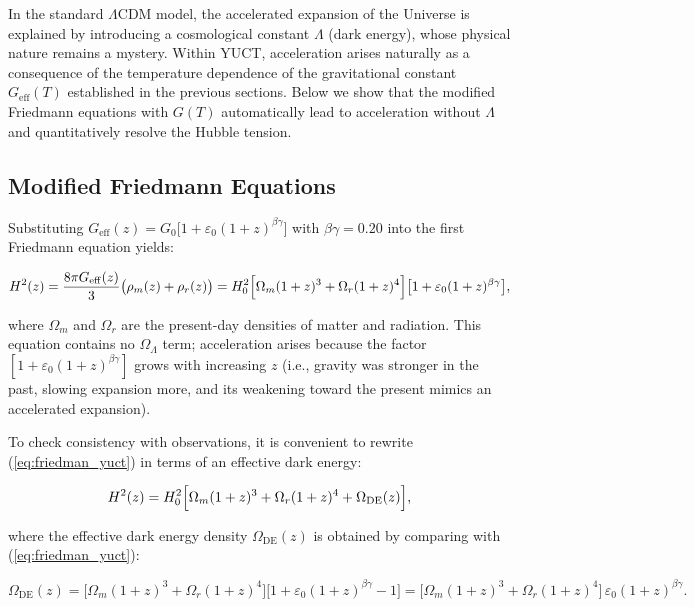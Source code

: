 \documentclass[12pt]{article}
\theoremstyle{remark}
\begin{document}
	In the standard \(\Lambda\)CDM model, the accelerated expansion of the Universe is explained by introducing a cosmological constant \(\Lambda\) (dark energy), whose physical nature remains a mystery. Within YUCT, acceleration arises naturally as a consequence of the temperature dependence of the gravitational constant \(G_{\mathrm{eff}}(T)\) established in the previous sections. Below we show that the modified Friedmann equations with \(G(T)\) automatically lead to acceleration without \(\Lambda\) and quantitatively resolve the Hubble tension.
	
	\subsection{Modified Friedmann Equations}
	
	Substituting \(G_{\mathrm{eff}}(z) = G_0\bigl[1 + \varepsilon_0 (1+z)^{\beta\gamma}\bigr]\) with \(\beta\gamma = 0.20\) into the first Friedmann equation yields:
	
	\begin{equation}
		H^2(z) = \frac{8\pi G_{\mathrm{eff}}(z)}{3} \bigl(\rho_m(z) + \rho_r(z)\bigr) = H_0^2\Bigl[\Omega_m (1+z)^3 + \Omega_r (1+z)^4\Bigr]\bigl[1 + \varepsilon_0 (1+z)^{\beta\gamma}\bigr],
		\label{eq:friedman_yuct}
	\end{equation}
	
	where \(\Omega_m\) and \(\Omega_r\) are the present-day densities of matter and radiation. This equation contains no \(\Omega_\Lambda\) term; acceleration arises because the factor \([1 + \varepsilon_0 (1+z)^{\beta\gamma}]\) grows with increasing \(z\) (i.e., gravity was stronger in the past, slowing expansion more, and its weakening toward the present mimics an accelerated expansion).
	
	To check consistency with observations, it is convenient to rewrite (\ref{eq:friedman_yuct}) in terms of an effective dark energy:
	
	\begin{equation}
		H^2(z) = H_0^2\Bigl[\Omega_m (1+z)^3 + \Omega_r (1+z)^4 + \Omega_{\mathrm{DE}}(z)\Bigr],
		\label{eq:effective_de}
	\end{equation}
	
	where the effective dark energy density \(\Omega_{\mathrm{DE}}(z)\) is obtained by comparing with (\ref{eq:friedman_yuct}):
	
	\begin{equation}
		\Omega_{\mathrm{DE}}(z) = \bigl[\Omega_m (1+z)^3 + \Omega_r (1+z)^4\bigr]\bigl[1 + \varepsilon_0 (1+z)^{\beta\gamma} - 1\bigr] = \bigl[\Omega_m (1+z)^3 + \Omega_r (1+z)^4\bigr]\,\varepsilon_0 (1+z)^{\beta\gamma}.
		\label{eq:de_yuct}
	\end{equation}
	
\end{document}
